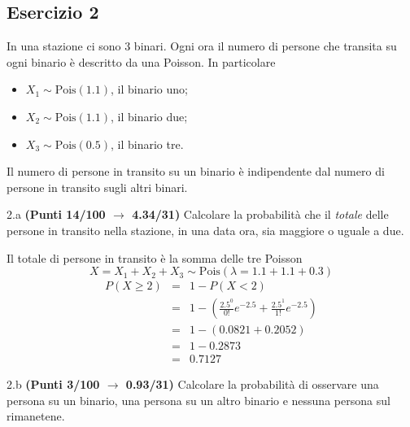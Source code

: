 \documentclass[
  11pt,
]{book}
\providecommand{\tightlist}{%
  \setlength{\itemsep}{0pt}\setlength{\parskip}{0pt}}
\theoremstyle{mytheoremstyle}
\theoremstyle{mydefstyle}
\newenvironment{sol}
  {
  \begin{tcolorbox}[enhanced,breakable,arc=0.1mm,boxrule=1pt,colback=white,colframe=iblue,
  title=\bf \fontfamily{lmss}\selectfont \hspace{.5 cm} Soluzione,drop fuzzy shadow]

}{
\end{tcolorbox}
  }
\begin{document}
\subsection{Esercizio 2}\label{esercizio-2-7}

In una stazione ci sono 3 binari. Ogni ora il numero di persone che transita su ogni
binario è descritto da una Poisson. In particolare

\begin{itemize}
\tightlist
\item
  \(X_1\sim\text{Pois}(1.1)\), il binario uno;
\item
  \(X_2\sim\text{Pois}(1.1)\), il binario due;
\item
  \(X_3\sim\text{Pois}(0.5)\), il binario tre.
\end{itemize}

Il numero di persone in transito su un binario è indipendente dal numero di persone in transito sugli altri binari.

2.a \textbf{(Punti 14/100 \(\rightarrow\) 4.34/31)} Calcolare la probabilità che il \emph{totale} delle persone in transito nella stazione, in una data ora, sia maggiore o uguale a due.

\begin{sol}
Il totale di persone in transito è la somma delle tre Poisson
\[
X=X_1+X_2+X_3\sim \text{Pois}(\lambda=1.1+1.1+0.3)
\]
\begin{eqnarray*}
   P( X \geq 2 ) &=& 1-P( X < 2 ) \\                 &=& 1-\left( \frac{ 2.5 ^{ 0 }}{ 0 !}e^{- 2.5 }+\frac{ 2.5 ^{ 1 }}{ 1 !}e^{- 2.5 } \right)\\                 &=& 1-( 0.0821+0.2052 )\\                 &=& 1- 0.2873 \\                 &=&   0.7127 
\end{eqnarray*}

\end{sol}

2.b \textbf{(Punti 3/100 \(\rightarrow\) 0.93/31)} Calcolare la probabilità di osservare una persona su un binario, una persona su un altro binario e nessuna persona sul rimanetene.
\end{document}
